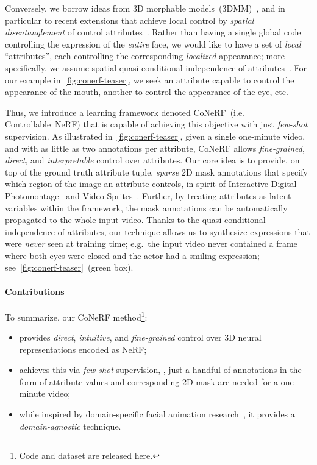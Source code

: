   Conversely, we borrow ideas from 3D morphable
  models~(3DMM)~\cite{blanz1999morphable}, and in particular to recent
  extensions that achieve local control by \textit{spatial disentanglement} of
  control attributes~\cite{wu2016anatomically,neumann2013sparse}.
  Rather than having a single global code controlling the expression of the
  \textit{entire} face, we would like to have a set of \textit{local}
  ``attributes'', each controlling the corresponding \textit{localized}
  appearance; more specifically, we assume spatial quasi-conditional
  independence of attributes~\cite{wu2016anatomically}.
  For our example in~\cref{fig:conerf-teaser}, we seek an attribute capable to
  control the appearance of the mouth, another to control the appearance of
  the eye, etc.

Thus, we introduce a learning framework
  denoted CoNeRF~(i.e. Controllable~NeRF) that is capable of achieving this
  objective with just \textit{few-shot} supervision.
  As illustrated in~\cref{fig:conerf-teaser}, given a single one-minute video,
  and with as little as two annotations per attribute, CoNeRF allows
  \textit{fine-grained}, \textit{direct}, and \textit{interpretable} control
  over attributes.
  Our core idea is to provide, on top of the ground truth attribute tuple,
  \textit{sparse} 2D mask annotations that specify which region of the image
  an attribute controls, in spirit of Interactive Digital
  Photomontage~\cite{agarwala2004interactive} and Video
  Sprites~\cite{schodl2002controlled}.
  Further, by treating attributes as latent variables within the framework,
  the mask annotations can be automatically propagated to the whole input
  video.
  Thanks to the quasi-conditional independence of attributes, our technique
  allows us to synthesize expressions that were \textit{never} seen at
  training time; e.g.~the input video never contained a frame where both eyes
  were closed and the actor had a smiling expression;
  see~\cref{fig:conerf-teaser}~(green box).

  \paragraph{Contributions}
    To summarize, our CoNeRF method\footnote{Code and dataset are released
    \href{https://github.com/kacperkan/conerf}{here}.
    }:
    \vspace{-.5em}
    \begin{itemize}[leftmargin=*]
      \setlength\itemsep{-.3em}
      \item provides \textit{direct}, \textit{intuitive}, and \textit{fine-grained} control over 3D neural representations encoded as NeRF;
      \item achieves this via \textit{few-shot} supervision, \eg, just a handful of annotations in the form of attribute values and corresponding 2D mask are needed for a one minute video;
      \item while inspired by domain-specific facial animation research~\cite{wu2016anatomically}, it provides a \textit{domain-agnostic} technique.
    \end{itemize}

    \color{black}

